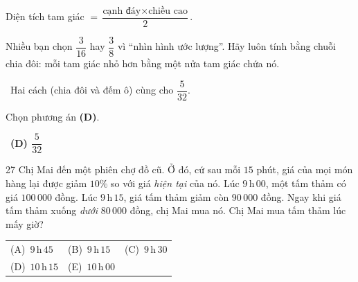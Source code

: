 \documentclass[11pt]{article}
\makeatletter
\providecommand{\AnsWord}{Đáp số}
\newcommand{\ans}[1]{\par\smallskip{\bfseries\color{tmGreen!88!black}\AnsWord:}\ {\bfseries\color{AnsRed}#1}\par}
\newcommand{\verify}[1]{\par\smallskip\noindent{\bfseries\color{tmGreen!80!black}\faCheckCircle\ \CheckWord}\ #1\par}
\newcommand{\choicesII}[5]{\par\smallskip\noindent
  \begin{tabularx}{\linewidth}{@{}XXX@{}}(A)\ #1&(B)\ #2&(C)\ #3\\(D)\ #4&(E)\ #5&\end{tabularx}\par}
\def\AnsWord{Đáp số}
\def\CheckWord{Thử lại:}
\makeatother
\begin{document}
{\begin{recallbox}Diện tích tam giác $=\dfrac{\text{cạnh đáy}\times\text{chiều cao}}{2}$.\end{recallbox}

\begin{warnbox}Nhiều bạn chọn $\dfrac{3}{16}$ hay $\dfrac38$ vì ``nhìn hình ước lượng''. Hãy luôn tính bằng chuỗi chia đôi: mỗi tam giác nhỏ hơn bằng một nửa tam giác chứa nó.\end{warnbox}

\verify{Hai cách (chia đôi và đếm ô) cùng cho $\dfrac{5}{32}$.}
Chọn phương án \textbf{(D)}.
\ans{(D) $\dfrac{5}{32}$}
}

\begin{probbox}{27}{\relax}
Chị Mai đến một phiên chợ đồ cũ. Ở đó, cứ sau mỗi $15$ phút, giá của mọi món hàng lại được giảm $10\%$ so với giá \emph{hiện tại} của nó. Lúc $9\,$h$\,00$, một tấm thảm có giá $100\,000$ đồng. Lúc $9\,$h$\,15$, giá tấm thảm giảm còn $90\,000$ đồng. Ngay khi giá tấm thảm xuống \emph{dưới} $80\,000$ đồng, chị Mai mua nó. Chị Mai mua tấm thảm lúc mấy giờ?
\choicesII{$9\,$h$\,45$}{$9\,$h$\,15$}{$9\,$h$\,30$}{$10\,$h$\,15$}{$10\,$h$\,00$}
\end{probbox}
\end{document}
